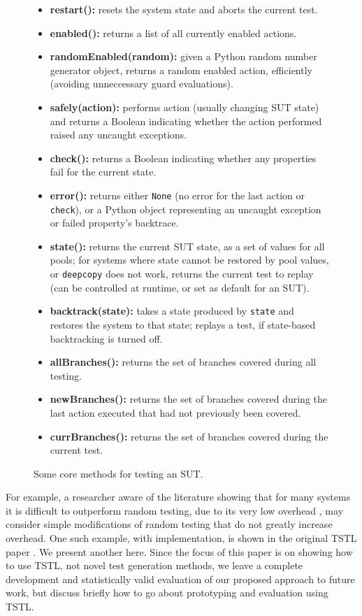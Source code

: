\begin{figure}
{\scriptsize
\begin{itemize}
\item {\bf restart():}  resets the system state and aborts the current test. 
\item {\bf enabled():} returns a list of all currently enabled actions.
\item {\bf randomEnabled(random):}  given a Python random number generator object, returns a random enabled action, efficiently (avoiding unneccessary guard evaluations).
\item {\bf safely(action):} performs action (usually changing SUT state)  and returns a Boolean indicating whether the action performed raised any uncaught exceptions. 
\item {\bf check():} returns a Boolean indicating whether any properties fail for the current state.
\item {\bf error():} returns either {\tt None} (no error for the last action or {\tt check}), or a Python object representing an uncaught exception or failed property's backtrace.
\item {\bf state():} returns the current SUT state, as a set of values for all pools; for systems where state cannot be restored by pool values, or {\tt deepcopy} does not work, returns the current test to replay (can be controlled at runtime, or set as default for an SUT).
\item {\bf backtrack(state):} takes a state produced by {\tt state} and restores the system to that state; replays a test, if state-based backtracking is turned off.
\item {\bf allBranches():} returns the set of branches covered during all testing.
\item {\bf newBranches():} returns the set of branches covered during the last action executed that had not previously been covered.
\item {\bf currBranches():} returns the set of branches covered during the current test.
\end{itemize} 
}
\caption{Some core methods for testing an SUT.}
\label{methods}
\end{figure}

For example, a researcher aware of the literature showing that for many systems it is difficult to outperform random testing, due to its very low overhead \cite{ISSRE12,ISSTA12}, may consider simple modifications of random testing that do not greatly increase overhead.  One such example, with implementation, is shown in the original TSTL paper \cite{NFM15}.  We present another here.  Since the focus of this paper is on showing how to use TSTL, not novel test generation methods, we leave a complete development and statistically valid evaluation of our proposed approach to future work, but discuss briefly how to go about prototyping and evaluation using TSTL.

